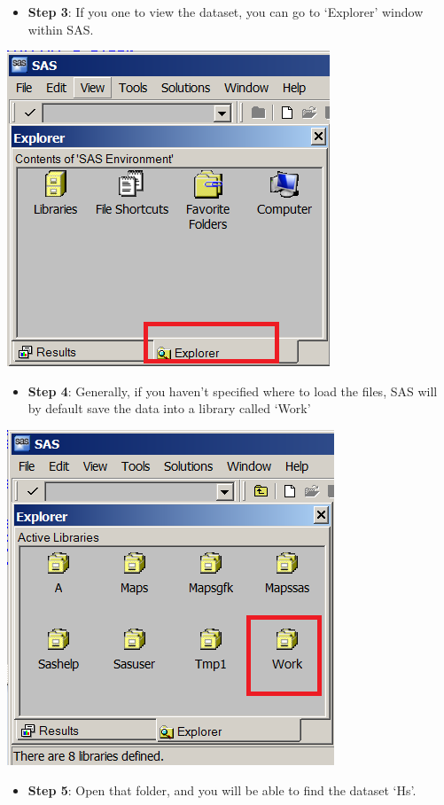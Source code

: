 \documentclass[
]{book}
\providecommand{\tightlist}{%
  \setlength{\itemsep}{0pt}\setlength{\parskip}{0pt}}
\begin{document}
\begin{itemize}
\tightlist
\item
  \textbf{Step 3}: If you one to view the dataset, you can go to `Explorer' window within SAS.
\end{itemize}

\includegraphics[width=0.65\linewidth]{images/abacus16}

\begin{itemize}
\tightlist
\item
  \textbf{Step 4}: Generally, if you haven't specified where to load the files, SAS will by default save the data into a library called `Work'
\end{itemize}

\includegraphics[width=0.65\linewidth]{images/abacus17}

\begin{itemize}
\tightlist
\item
  \textbf{Step 5}: Open that folder, and you will be able to find the dataset `Hs'.
\end{itemize}
\end{document}
